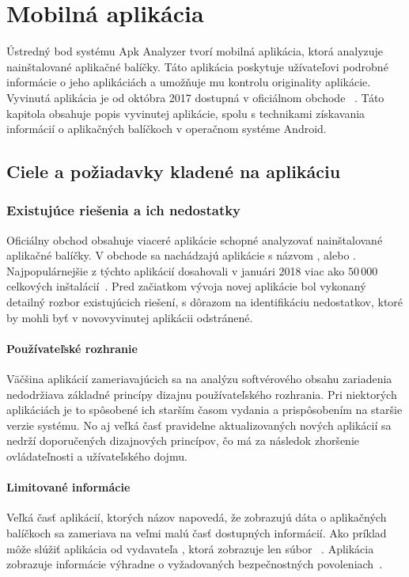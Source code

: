 \chapter{Mobilná aplikácia}
\label{chap:mobilna-aplikacia}

Ústredný bod systému Apk Analyzer tvorí mobilná aplikácia, ktorá analyzuje nainštalované aplikačné balíčky. Táto aplikácia poskytuje užívateľovi podrobné informácie o jeho aplikáciách a umožňuje mu kontrolu originality aplikácie. Vyvinutá aplikácia je od októbra 2017 dostupná v oficiálnom obchode ~\cite{gp}. Táto kapitola obsahuje popis vyvinutej aplikácie, spolu s technikami získavania informácií o aplikačných balíčkoch v operačnom systéme Android.

\section{Ciele a požiadavky kladené na aplikáciu}
\subsection{Existujúce riešenia a ich nedostatky}
Oficiálny obchod  obsahuje viaceré aplikácie schopné analyzovať nainštalované aplikačné balíčky. V obchode sa nachádzajú aplikácie s názvom ,  alebo . Najpopulárnejšie z týchto aplikácií dosahovali v januári 2018 viac ako $50\,000$ celkových inštalácií~\cite{kfOvdBmwje56iW6j}. Pred začiatkom vývoja novej aplikácie bol vykonaný detailný rozbor existujúcich riešení, s dôrazom na identifikáciu nedostatkov, ktoré by mohli byť v novovyvinutej aplikácii odstránené.
\subsubsection{\textbf{Používateľské rozhranie}}
Väčšina aplikácií zameriavajúcich sa na analýzu softvérového obsahu zariadenia nedodržiava základné princípy dizajnu používateľského rozhrania. Pri niektorých aplikáciách je to spôsobené ich starším časom vydania a prispôsobením na staršie verzie systému. No aj veľká časť pravidelne aktualizovaných nových aplikácií sa nedrží doporučených dizajnových princípov, čo má za následok zhoršenie ovládateľnosti a užívateľského dojmu.

\subsubsection{\textbf{Limitované informácie}}
Veľká časť aplikácií, ktorých názov napovedá, že zobrazujú dáta o aplikačných balíčkoch sa zameriava na veľmi malú časť dostupných informácií. Ako príklad môže slúžiť aplikácia  od vydavateľa , ktorá zobrazuje len súbor ~\cite{kfOvdBmwje56iW6i}. Aplikácia  zobrazuje informácie výhradne o vyžadovaných bezpečnostných povoleniach~\cite{kfOvdBmwje56iW6i}.



